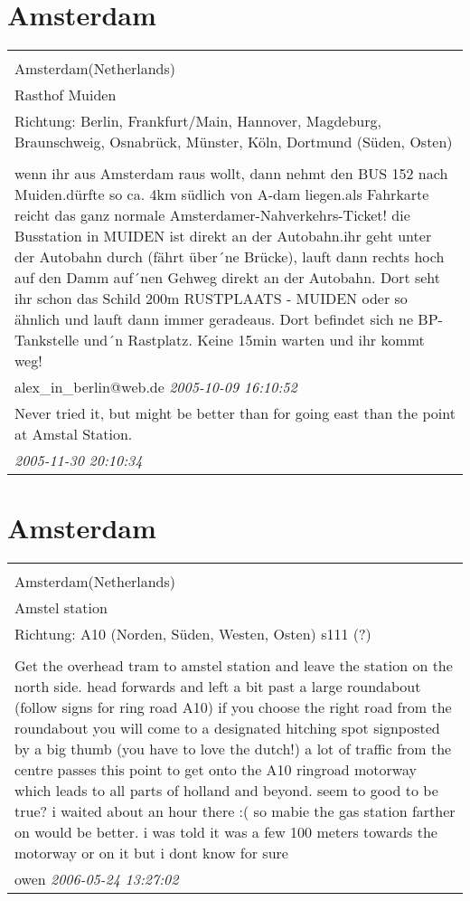 \documentclass[a4paper,12pt]{article}
\begin{document}
\section{Amsterdam}
\begin{tabular}{|p{13cm}|}
\hline\\
Amsterdam(Netherlands)\\
Rasthof Muiden\\
Richtung: Berlin, Frankfurt/Main, Hannover, Magdeburg, Braunschweig, Osnabrück, Münster, Köln, Dortmund (Süden, Osten) \\
\hline\\
wenn ihr aus Amsterdam raus wollt, dann nehmt den BUS 152 nach Muiden.dürfte so ca. 4km südlich von A-dam liegen.als Fahrkarte reicht das ganz normale Amsterdamer-Nahverkehrs-Ticket! die Busstation in MUIDEN ist direkt an der Autobahn.ihr geht unter der Autobahn durch (fährt über´ne Brücke), lauft dann rechts hoch auf den Damm auf´nen Gehweg direkt an der Autobahn. Dort seht ihr schon das Schild 200m RUSTPLAATS - MUIDEN oder so ähnlich und lauft dann immer geradeaus. Dort befindet sich ne BP-Tankstelle und´n Rastplatz. Keine 15min warten und ihr kommt weg!
\\
alex\_in\_berlin@web.de \textit{ 2005-10-09 16:10:52 }\\\hline Never tried it, but might be better than for going east than the point at Amstal Station. \\
\textit{ 2005-11-30 20:10:34 }\\\hline
\end{tabular}


\section{Amsterdam}
\begin{tabular}{|p{13cm}|}
\hline\\
Amsterdam(Netherlands)\\
Amstel station\\
Richtung: A10 (Norden, Süden, Westen, Osten) s111 (?) \\
\hline\\
Get the overhead tram to amstel station and leave the station on the north side. head forwards and left a bit past a large roundabout (follow signs for ring road A10) if you choose the right road from the roundabout you will come to a designated hitching spot signposted by a big thumb (you have to love the dutch!) a lot of traffic from the centre passes this point to get onto the A10 ringroad motorway which leads to all parts of holland and beyond. seem to good to be true? i waited about an hour there :( so mabie the gas station farther on would be better. i was told it was a few 100 meters towards the motorway or on it but i dont know for sure \\
owen \textit{ 2006-05-24 13:27:02 }\\\hline
\end{tabular}
\end{document}
